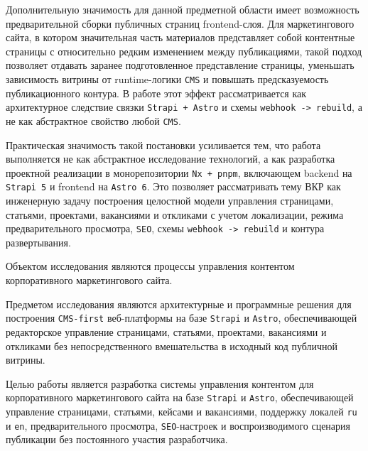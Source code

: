 Дополнительную значимость для данной предметной области имеет возможность предварительной
сборки публичных страниц frontend-слоя. Для маркетингового сайта, в котором значительная
часть материалов представляет собой контентные страницы с относительно редким изменением
между публикациями, такой подход позволяет отдавать заранее подготовленное представление
страницы, уменьшать зависимость витрины от runtime-логики \texttt{CMS} и повышать
предсказуемость публикационного контура. В работе этот эффект рассматривается как
архитектурное следствие связки \texttt{Strapi + Astro} и схемы
\texttt{webhook -> rebuild}, а не как абстрактное свойство любой \texttt{CMS}.

Практическая значимость такой постановки усиливается тем, что работа выполняется не как
абстрактное исследование технологий, а как разработка проектной реализации в
монорепозитории \texttt{Nx + pnpm}, включающем backend на
\texttt{Strapi 5} и frontend на \texttt{Astro 6}. Это позволяет рассматривать тему ВКР
как инженерную задачу построения целостной модели управления страницами, статьями,
проектами, вакансиями и откликами с учетом локализации, режима предварительного
просмотра, \texttt{SEO}, схемы \texttt{webhook -> rebuild} и контура развертывания.


Объектом исследования являются процессы управления контентом корпоративного маркетингового
сайта.

Предметом исследования являются архитектурные и программные решения для построения
\texttt{CMS-first} веб-платформы на базе \texttt{Strapi} и \texttt{Astro}, обеспечивающей
редакторское управление страницами, статьями, проектами, вакансиями и откликами без
непосредственного вмешательства в исходный код публичной витрины.


Целью работы является разработка системы управления контентом для корпоративного
маркетингового сайта на базе \texttt{Strapi} и \texttt{Astro}, обеспечивающей управление
страницами, статьями, кейсами и вакансиями, поддержку локалей \texttt{ru} и \texttt{en},
предварительного просмотра, \texttt{SEO}-настроек и воспроизводимого сценария публикации
без постоянного участия разработчика.

